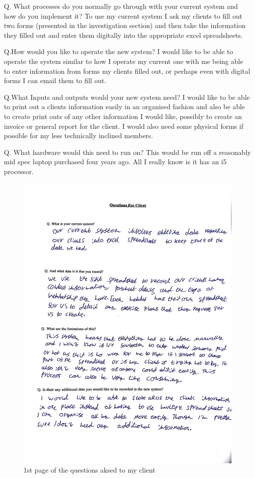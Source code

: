 Q. What processes do you normally go through with your current system and how do you implement it?
To use my current system I ask my clients to fill out two forms (presented in the investigation section) and then take the information they filled out and enter them digitally into the appropriate excel spreadsheets.

Q.How would you like to operate the new system?
I would like to be able to operate the system similar to how I operate my current one with me being able to enter information from forms my clients filled out, or perhaps even with digital forms I can email them to fill out.

Q.What Inputs and outputs would your new system need? 
I would like to be able to print out a clients information easily in an organised fashion and also be able to create print outs of any other information I would like, possibly to create an invoice or general report for the client. I would also need some physical forms if possible for my less technically inclined members.

Q. What hardware would this need to run on?
﻿This would be run off a reasonably mid spec laptop purchased four years ago. All I really know is it has an i5 processor.

\begin{figure}[H]
    \includegraphics[width=\textwidth]{questionaire 1.jpg}
    \caption{1st page of the questions aksed to my client} \label{fig:1st page of the questions aksed to my clien}
\end{figure}
